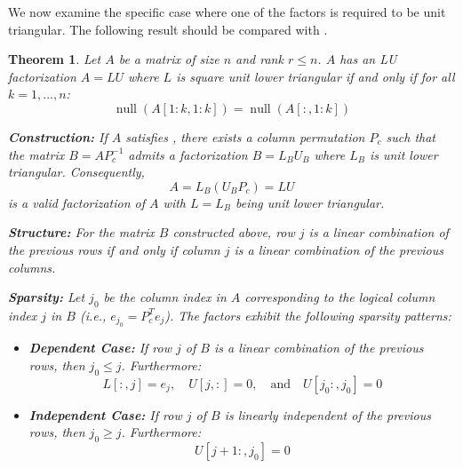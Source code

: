 \documentclass{article}
\DeclareMathOperator{\nl}{null}
\newtheorem{theorem}{Theorem}[section]
\begin{document}
We now examine the specific case where one of the factors is required to be unit triangular. The following result should be compared with .

\begin{theorem}\label{thm:main_unit_lower}
    Let $A$ be a matrix of size $n$ and rank $r \le n$. $A$ has an LU factorization $A = LU$ where $L$ is square unit lower triangular if and only if for all $k = 1, \ldots, n$:
    \begin{equation}
        \label{eq:cond_unit_lower}
        \nl(A[1:k,1:k]) = \nl(A[:,1:k])
    \end{equation}

    \noindent\textbf{Construction:} If $A$ satisfies , there exists a column permutation $P_c$ such that the matrix $B = A P_c^{-1}$ admits a factorization $B = L_B U_B$ where $L_B$ is unit lower triangular. Consequently,
    \[ A = L_B (U_B P_c) = L U \]
    is a valid factorization of $A$ with $L=L_B$ being unit lower triangular.

    \noindent\textbf{Structure:} For the matrix $B$ constructed above, row $j$ is a linear combination of the previous rows if and only if column $j$ is a linear combination of the previous columns.

    \noindent\textbf{Sparsity:} Let $j_0$ be the column index in $A$ corresponding to the logical column index $j$ in $B$ (i.e., $e_{j_0} = P_c^T e_j$). The factors exhibit the following sparsity patterns:
    \begin{itemize}
        \item \textbf{Dependent Case:} If row $j$ of $B$ is a linear combination of the previous rows, then $j_0 \le j$. Furthermore:
        \[ L[:,j] = e_j, \quad U[j,:] = 0, \quad \text{and} \quad U[j_0:, j_0] = 0 \]
        \item \textbf{Independent Case:} If row $j$ of $B$ is linearly independent of the previous rows, then $j_0 \ge j$. Furthermore:
        \[ U[j+1:, j_0] = 0 \]
    \end{itemize}
\end{theorem}
\end{document}
